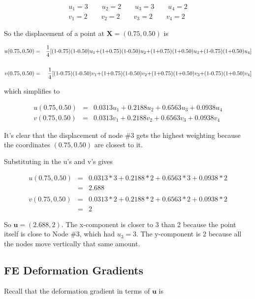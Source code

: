 \begin{eqnarray*}
u_1 = 3 \qquad u_2 = 2 \qquad u_3 = 3 \qquad u_4 = 2 \\
v_1 = 2 \qquad v_2 = 2 \qquad v_3 = 2 \qquad v_4 = 2
\end{eqnarray*}

So the displacement of a point at $ \mathbf{ X} = (0.75,0.50) $ is

\begin{eqnarray*}
u(0.75,0.50) & = & {1\over 4}[(1\text{-}0.75)(1\text{-}0.50)u_1 \text{+} (1\text{+}0.75)(1\text{-}0.50)u_2 \text{+} (1\text{+}0.75)(1\text{+}0.50)u_3 \text{+} (1\text{-}0.75)(1\text{+}0.50)u_4] \\
\\
v(0.75,0.50) & = & {1\over 4}[(1\text{-}0.75)(1\text{-}0.50)v_1 \text{+} (1\text{+}0.75)(1\text{-}0.50)v_2 \text{+} (1\text{+}0.75)(1\text{+}0.50)v_3 \text{+} (1\text{-}0.75)(1\text{+}0.50)v_4] \\
\end{eqnarray*}

which simplifies to

\begin{eqnarray*}
u(0.75,0.50) & = & 0.0313 u_1 + 0.2188 u_2 + 0.6563 u_3 + 0.0938 u_4
\\
v(0.75,0.50) & = & 0.0313 v_1 + 0.2188 v_2 + 0.6563 v_3 + 0.0938 v_4
\end{eqnarray*}

It's clear that the displacement of node \#3 gets the highest weighting because the coordinates $ (0.75, 0.50) $ are closest to it.

Substituting in the u's and v's gives

\begin{eqnarray*}
u(0.75,0.50) & = & 0.0313 * 3 + 0.2188 * 2 + 0.6563 * 3 + 0.0938 * 2 \\
	     & = & 2.688 \\
\\
v(0.75,0.50) & = & 0.0313 * 2 + 0.2188 * 2 + 0.6563 * 2 + 0.0938 * 2 \\
& = & 2
\end{eqnarray*}

So $ \mathbf{ u} = (2.688, 2) $.  The x-component is closer to 3 than 2 because the point itself is close to Node \#3, which had $ u_3 = 3 $. The y-component is 2 because all the nodes move vertically that same amount.

\subsection{FE Deformation Gradients}
Recall that the deformation gradient in terms of $ \mathbf{ u} $ is

